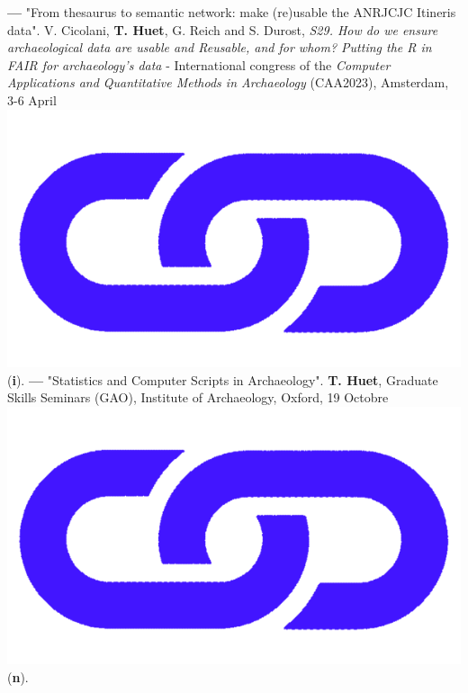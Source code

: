 \documentclass{article}
\begin{document}
\textbf{--- }"From thesaurus to semantic network: make (re)usable the ANRJCJC Itineris data". V. Cicolani, \textbf{T. Huet}, G. Reich and S. Durost, \textit{S29. How do we ensure archaeological data are usable and Reusable, and for whom? Putting the R in FAIR for archaeology's data} - International congress of the \textit{Computer Applications and Quantitative Methods in Archaeology} (CAA2023), Amsterdam, 3-6 April \href{https://anr-itineris.github.io/itineris/talk/caa-2023/thesaurus/pres/#/title-slide}{\includegraphics[scale=0.015]{link_darkblue.png}} (\textbf{i}).
\smallbreak
\textbf{--- }"Statistics and Computer Scripts in Archaeology". \textbf{T. Huet}, Graduate Skills Seminars (GAO), Institute of Archaeology, Oxford, 19 Octobre \href{http://shinyserver.cfs.unipi.it:3838/teach/stats/gao/_site/#/title-slide}{\includegraphics[scale=0.015]{link_darkblue.png}} (\textbf{n}).
\smallbreak
\end{document}
